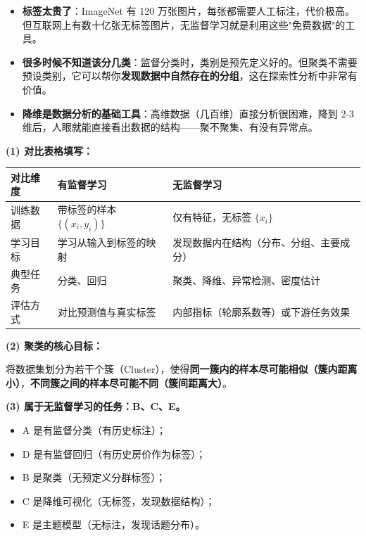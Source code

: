 \documentclass[a4paper,11pt]{ctexart}
\begin{document}
\begin{beginnerbox}
    \begin{itemize}
        \item \textbf{标签太贵了}：ImageNet 有 120 万张图片，每张都需要人工标注，代价极高。但互联网上有数十亿张无标签图片，无监督学习就是利用这些"免费数据"的工具。
        \item \textbf{很多时候不知道该分几类}：监督分类时，类别是预先定义好的。但聚类不需要预设类别，它可以帮你\textbf{发现数据中自然存在的分组}，这在探索性分析中非常有价值。
        \item \textbf{降维是数据分析的基础工具}：高维数据（几百维）直接分析很困难，降到 2-3 维后，人眼就能直接看出数据的结构——聚不聚集、有没有异常点。
    \end{itemize}
\end{beginnerbox}

\begin{solutionbox}[参考答案与详细解析]
    \textbf{(1) 对比表格填写：}

    \begin{center}
    \begin{tabular}{p{3.5cm} p{4.5cm} p{4.5cm}}
        \toprule
        对比维度 & 有监督学习 & 无监督学习 \\
        \midrule
        训练数据 & 带标签的样本 $\{(x_i, y_i)\}$ & 仅有特征，无标签 $\{x_i\}$ \\[1.2em]
        学习目标 & 学习从输入到标签的映射 & 发现数据内在结构（分布、分组、主要成分） \\[1.2em]
        典型任务 & 分类、回归 & 聚类、降维、异常检测、密度估计 \\[1.2em]
        评估方式 & 对比预测值与真实标签 & 内部指标（轮廓系数等）或下游任务效果 \\
        \bottomrule
    \end{tabular}
    \end{center}

    \textbf{(2) 聚类的核心目标：}

    将数据集划分为若干个簇（Cluster），使得\textbf{同一簇内的样本尽可能相似（簇内距离小）}，\textbf{不同簇之间的样本尽可能不同（簇间距离大）}。

    \textbf{(3) 属于无监督学习的任务：B、C、E。}

    \begin{itemize}
        \item A 是有监督分类（有历史标注）；
        \item D 是有监督回归（有历史房价作为标签）；
        \item B 是聚类（无预定义分群标签）；
        \item C 是降维可视化（无标签，发现数据结构）；
        \item E 是主题模型（无标注，发现话题分布）。
    \end{itemize}
\end{solutionbox}
\end{document}
